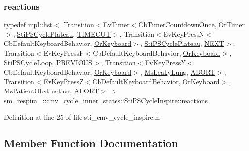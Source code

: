 \subsubsection{\texorpdfstring{reactions}{reactions}}
{\footnotesize\ttfamily typedef mpl\+::list$<$ Transition$<$Ev\+Timer$<$Cb\+Timer\+Countdown\+Once, \hyperlink{classsm__respira__1_1_1OrTimer}{Or\+Timer}$>$, \hyperlink{structsm__respira__1_1_1cmv__cycle__inner__states_1_1StiPSCyclePlateau}{Sti\+P\+S\+Cycle\+Plateau}, \hyperlink{structsm__respira__1_1_1cmv__cycle__inner__states_1_1StiPSCycleInspire_1_1TIMEOUT}{T\+I\+M\+E\+O\+UT}$>$, Transition$<$Ev\+Key\+PressN$<$Cb\+Default\+Keyboard\+Behavior, \hyperlink{classsm__respira__1_1_1OrKeyboard}{Or\+Keyboard}$>$, \hyperlink{structsm__respira__1_1_1cmv__cycle__inner__states_1_1StiPSCyclePlateau}{Sti\+P\+S\+Cycle\+Plateau}, \hyperlink{structsm__respira__1_1_1cmv__cycle__inner__states_1_1StiPSCycleInspire_1_1NEXT}{N\+E\+XT}$>$, Transition$<$Ev\+Key\+PressP$<$Cb\+Default\+Keyboard\+Behavior, \hyperlink{classsm__respira__1_1_1OrKeyboard}{Or\+Keyboard}$>$, \hyperlink{structsm__respira__1_1_1cmv__cycle__inner__states_1_1StiPSCycleLoop}{Sti\+P\+S\+Cycle\+Loop}, \hyperlink{structsm__respira__1_1_1cmv__cycle__inner__states_1_1StiPSCycleInspire_1_1PREVIOUS}{P\+R\+E\+V\+I\+O\+US}$>$, Transition$<$Ev\+Key\+PressY$<$Cb\+Default\+Keyboard\+Behavior, \hyperlink{classsm__respira__1_1_1OrKeyboard}{Or\+Keyboard}$>$, \hyperlink{classsm__respira__1_1_1MsLeakyLung}{Ms\+Leaky\+Lung}, \hyperlink{classABORT}{A\+B\+O\+RT}$>$, Transition$<$Ev\+Key\+PressZ$<$Cb\+Default\+Keyboard\+Behavior, \hyperlink{classsm__respira__1_1_1OrKeyboard}{Or\+Keyboard}$>$, \hyperlink{classsm__respira__1_1_1MsPatientObstruction}{Ms\+Patient\+Obstruction}, \hyperlink{classABORT}{A\+B\+O\+RT}$>$ $>$ \hyperlink{structsm__respira__1_1_1cmv__cycle__inner__states_1_1StiPSCycleInspire_a623cee3fa3b09047379a349a8391b204}{sm\+\_\+respira\+\_\+::cmv\+\_\+cycle\+\_\+inner\+\_\+states\+::\+Sti\+P\+S\+Cycle\+Inspire\+::reactions}}



Definition at line 25 of file sti\+\_\+cmv\+\_\+cycle\+\_\+inspire.\+h.



\subsection{Member Function Documentation}
\mbox{\label{structsm__respira__1_1_1cmv__cycle__inner__states_1_1StiPSCycleInspire_ac8ff5d913f0eff6be554f57b4b97951d}} 
